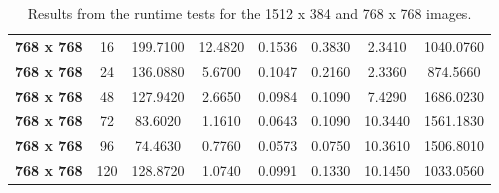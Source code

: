 \documentclass[11pt, a4paper]{article}
\begin{document}
\begin{table}
\begin{tabular}{|c|c|c|c|c|c|c|c|}
					\textbf{768 x 768} & 16    & 199.7100 & 12.4820 & 0.1536 & 0.3830 & 2.3410 & 1040.0760 \\
					\textbf{768 x 768} & 24    & 136.0880 & 5.6700 & 0.1047 & 0.2160 & 2.3360 & 874.5660 \\
					\textbf{768 x 768} & 48    & 127.9420 & 2.6650 & 0.0984 & 0.1090 & 7.4290 & 1686.0230 \\
					\textbf{768 x 768} & 72    & 83.6020 & 1.1610 & 0.0643 & 0.1090 & 10.3440 & 1561.1830 \\
					\textbf{768 x 768} & 96    & 74.4630 & 0.7760 & 0.0573 & 0.0750 & 10.3610 & 1506.8010 \\
					\textbf{768 x 768} & 120   & 128.8720 & 1.0740 & 0.0991 & 0.1330 & 10.1450 & 1033.0560 \\
				\hline
			\end{tabular}
		\caption{Results from the runtime tests for the 1512 x 384 and 768 x 768 images.}
		\label{tab:all_data}
	\end{table}
		
\end{document}
